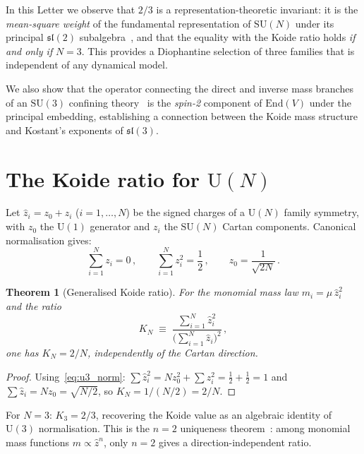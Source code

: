 \documentclass[final,3p,times,twocolumn]{elsarticle}
\newcommand{\SU}{\mathrm{SU}}
\newcommand{\UU}{\mathrm{U}}
\newtheorem{theorem}{Theorem}
\begin{document}
In this Letter we observe that $2/3$ is a
representation-theoretic invariant: it is the
\emph{mean-square weight} of the fundamental representation
of $\SU(N)$ under its principal $\mathfrak{sl}(2)$
subalgebra~\cite{Kostant:1959}, and that the equality with
the Koide ratio holds \emph{if and only if} $N = 3$.
This provides a Diophantine selection of three families that
is independent of any dynamical model.

We also show that the operator connecting the direct and
inverse mass branches of an $\SU(3)$ confining
theory~\cite{Seiberg:1995,Rivero:2024} is the \emph{spin-2}
component of $\mathrm{End}(V)$ under the principal embedding,
establishing a connection between the Koide mass structure and
Kostant's exponents of $\mathfrak{sl}(3)$.


\section{The Koide ratio for $\UU(N)$}
\label{sec:KN}

Let $\hat{z}_i = z_0 + z_i$ ($i = 1, \ldots, N$) be the signed
charges of a $\UU(N)$ family symmetry, with $z_0$ the
$\UU(1)$ generator and $z_i$ the $\SU(N)$ Cartan components.
Canonical normalisation gives:
\begin{equation}
  \sum_{i=1}^{N} z_i = 0\,,\qquad
  \sum_{i=1}^{N} z_i^2 = \frac{1}{2}\,,\qquad
  z_0 = \frac{1}{\sqrt{2N}}\,.
  \label{eq:u3_norm}
\end{equation}

\begin{theorem}[Generalised Koide ratio]
\label{thm:KN}
For the monomial mass law $m_i = \mu\,\hat{z}_i^2$ and the
ratio
\begin{equation}
  K_N \;\equiv\;
  \frac{\sum_{i=1}^N \hat{z}_i^2}
  {\bigl(\sum_{i=1}^N \hat{z}_i\bigr)^2}\,,
\end{equation}
one has $K_N = 2/N$, independently of the Cartan direction.
\end{theorem}

\begin{proof}
Using~\eqref{eq:u3_norm}:
$\sum \hat{z}_i^2 = N z_0^2 + \sum z_i^2 = \tfrac{1}{2} +
\tfrac{1}{2} = 1$
and $\sum \hat{z}_i = N z_0 = \sqrt{N/2}$,
so $K_N = 1/(N/2) = 2/N$.
\end{proof}

For $N = 3$: $K_3 = 2/3$, recovering the Koide value as
an algebraic identity of $\UU(3)$ normalisation.
This is the $n = 2$ uniqueness
theorem~\cite{Koide:1983,Rivero:2024}: among monomial mass
functions $m \propto \hat{z}^n$, only $n = 2$ gives a
direction-independent ratio.
\end{document}
